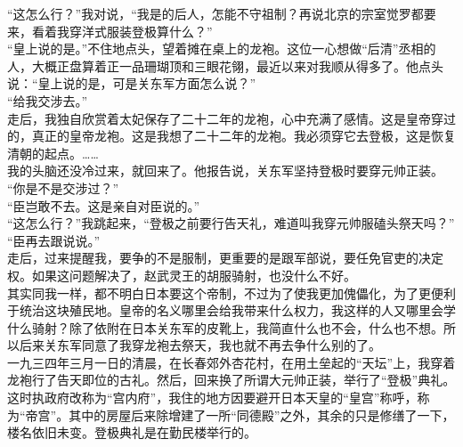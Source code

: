 “这怎么行？”我对说，“我是的后人，怎能不守祖制？再说北京的宗室觉罗都要来，看着我穿洋式服装登极算什么？”\\

“皇上说的是。”不住地点头，望着摊在桌上的龙袍。这位一心想做“后清”丞相的人，大概正盘算着正一品珊瑚顶和三眼花翎，最近以来对我顺从得多了。他点头说：“皇上说的是，可是关东军方面怎么说？”\\

“给我交涉去。”\\

走后，我独自欣赏着太妃保存了二十二年的龙袍，心中充满了感情。这是皇帝穿过的，真正的皇帝龙袍。这是我想了二十二年的龙袍。我必须穿它去登极，这是恢复清朝的起点。……\\

我的头脑还没冷过来，就回来了。他报告说，关东军坚持登极时要穿元帅正装。\\

“你是不是交涉过？”\\

“臣岂敢不去。这是亲自对臣说的。”\\

“这怎么行？”我跳起来，“登极之前要行告天礼，难道叫我穿元帅服磕头祭天吗？”\\

“臣再去跟说说。”\\

走后，过来提醒我，要争的不是服制，更重要的是跟军部说，要任免官吏的决定权。如果这问题解决了，赵武灵王的胡服骑射，也没什么不好。\\

其实同我一样，都不明白日本要这个帝制，不过为了使我更加傀儡化，为了更便利于统治这块殖民地。皇帝的名义哪里会给我带来什么权力，我这样的人又哪里会学什么骑射？除了依附在日本关东军的皮靴上，我简直什么也不会，什么也不想。所以后来关东军同意了我穿龙袍去祭天，我也就不再去争什么别的了。\\

一九三四年三月一日的清晨，在长春郊外杏花村，在用土垒起的“天坛”上，我穿着龙袍行了告天即位的古礼。然后，回来换了所谓大元帅正装，举行了“登极”典礼。这时执政府改称为“宫内府”，我住的地方因要避开日本天皇的“皇宫”称呼，称为“帝宫”。其中的房屋后来除增建了一所“同德殿”之外，其余的只是修缮了一下，楼名依旧未变。登极典礼是在勤民楼举行的。\\

